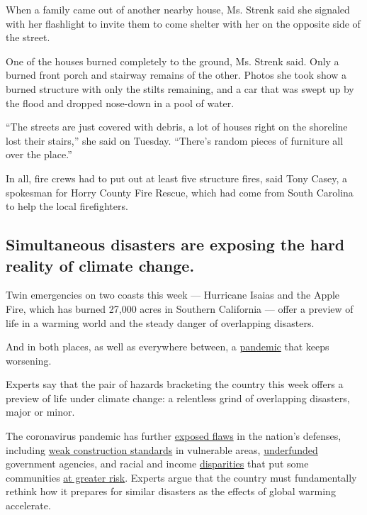 When a family came out of another nearby house, Ms. Strenk said she
signaled with her flashlight to invite them to come shelter with her on
the opposite side of the street.

One of the houses burned completely to the ground, Ms. Strenk said. Only
a burned front porch and stairway remains of the other. Photos she took
show a burned structure with only the stilts remaining, and a car that
was swept up by the flood and dropped nose-down in a pool of water.

``The streets are just covered with debris, a lot of houses right on the
shoreline lost their stairs,'' she said on Tuesday. ``There's random
pieces of furniture all over the place.''

In all, fire crews had to put out at least five structure fires, said
Tony Casey, a spokesman for Horry County Fire Rescue, which had come
from South Carolina to help the local firefighters.

\hypertarget{simultaneous-disasters-are-exposing-the-hard-reality-of-climate-change}{%
\subsection{Simultaneous disasters are exposing the hard reality of
climate
change.}\label{simultaneous-disasters-are-exposing-the-hard-reality-of-climate-change}}

Twin emergencies on two coasts this week --- Hurricane Isaias and the
Apple Fire, which has burned 27,000 acres in Southern California ---
offer a preview of life in a warming world and the steady danger of
overlapping disasters.

And in both places, as well as everywhere between, a
\href{https://www.nytimes3xbfgragh.onion/interactive/2020/world/coronavirus-maps.html}{pandemic}
that keeps worsening.

Experts say that the pair of hazards bracketing the country this week
offers a preview of life under climate change: a relentless grind of
overlapping disasters, major or minor.

The coronavirus pandemic has further
\href{https://www.nytimes3xbfgragh.onion/2020/05/22/climate/fema-volunteer-disaster-response.html}{exposed
flaws} in the nation's defenses, including
\href{https://www.nytimes3xbfgragh.onion/2019/10/26/climate/building-codes-secret-deal.html}{weak
construction standards} in vulnerable areas,
\href{https://newrepublic.com/article/158486/towns-arent-equipped-handle-climate-emergencies}{underfunded}
government agencies, and racial and income
\href{https://www.nytimes3xbfgragh.onion/2020/05/17/climate/pollution-poverty-coronavirus.html}{disparities}
that put some communities
\href{https://www.nytimes3xbfgragh.onion/2020/07/24/climate/houston-flooding-race.html}{at
greater risk}. Experts argue that the country must fundamentally rethink
how it prepares for similar disasters as the effects of global warming
accelerate.

